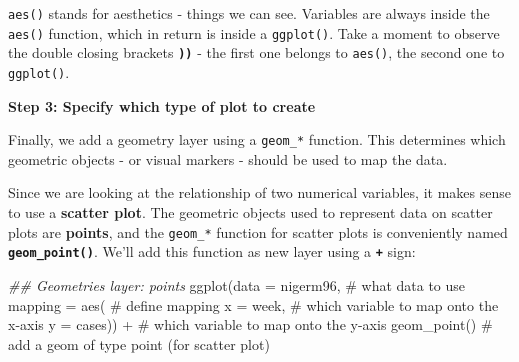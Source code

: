 \documentclass[
  letterpaper,
  DIV=11,
  numbers=noendperiod]{scrreprt}
\newenvironment{Shaded}{\begin{snugshade}}{\end{snugshade}}
\newcommand{\AttributeTok}[1]{\textcolor[rgb]{0.40,0.45,0.13}{#1}}
\newcommand{\CommentTok}[1]{\textcolor[rgb]{0.37,0.37,0.37}{#1}}
\newcommand{\DocumentationTok}[1]{\textcolor[rgb]{0.37,0.37,0.37}{\textit{#1}}}
\newcommand{\FunctionTok}[1]{\textcolor[rgb]{0.28,0.35,0.67}{#1}}
\newcommand{\NormalTok}[1]{\textcolor[rgb]{0.00,0.23,0.31}{#1}}
\newcommand{\SpecialCharTok}[1]{\textcolor[rgb]{0.37,0.37,0.37}{#1}}
\begin{document}
\begin{tcolorbox}[enhanced jigsaw, colframe=quarto-callout-note-color-frame, rightrule=.15mm, opacityback=0, breakable, coltitle=black, colbacktitle=quarto-callout-note-color!10!white, bottomrule=.15mm, leftrule=.75mm, toprule=.15mm, arc=.35mm, bottomtitle=1mm, colback=white, left=2mm, opacitybacktitle=0.6, titlerule=0mm, title=\textcolor{quarto-callout-note-color}{\faInfo}\hspace{0.5em}{Key Point}, toptitle=1mm]

\texttt{aes()} stands for aesthetics - things we can see. Variables are
always inside the \texttt{aes()} function, which in return is inside a
\texttt{ggplot()}. Take a moment to observe the double closing brackets
\textbf{\texttt{))}} - the first one belongs to \texttt{aes()}, the
second one to \texttt{ggplot()}.

\end{tcolorbox}

\textbf{Step 3: Specify which type of plot to create}

Finally, we add a geometry layer using a \texttt{geom\_*} function. This
determines which geometric objects - or visual markers - should be used
to map the data.

Since we are looking at the relationship of two numerical variables, it
makes sense to use a \textbf{scatter plot}. The geometric objects used
to represent data on scatter plots are \textbf{points}, and the
\texttt{geom\_*} function for scatter plots is conveniently named
\textbf{\texttt{geom\_point()}}. We'll add this function as new layer
using a \textbf{\texttt{+}} sign:

\begin{Shaded}
\begin{Highlighting}[]
\DocumentationTok{\#\# Geometries layer: points}
\FunctionTok{ggplot}\NormalTok{(}\AttributeTok{data =}\NormalTok{ nigerm96, }\CommentTok{\# what data to use}
       \AttributeTok{mapping =} \FunctionTok{aes}\NormalTok{(   }\CommentTok{\# define mapping}
         \AttributeTok{x =}\NormalTok{ week,      }\CommentTok{\# which variable to map onto the x{-}axis}
         \AttributeTok{y =}\NormalTok{ cases)) }\SpecialCharTok{+}  \CommentTok{\# which variable to map onto the y{-}axis}
  \FunctionTok{geom\_point}\NormalTok{()          }\CommentTok{\# add a geom of type \textasciigrave{}point\textasciigrave{} (for scatter plot)}
\end{Highlighting}
\end{Shaded}
\end{document}
